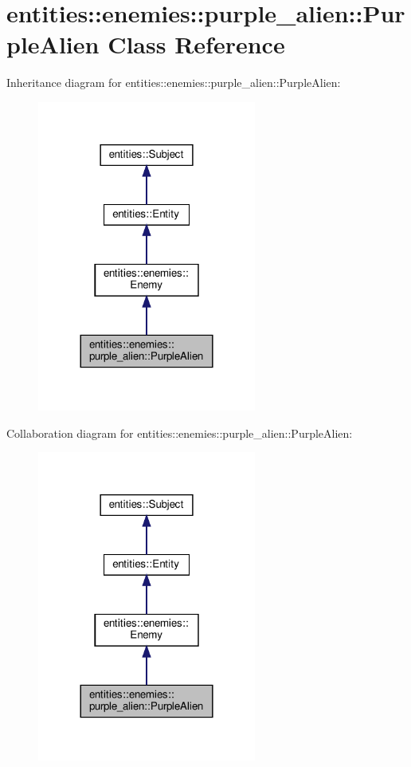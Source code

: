 \hypertarget{classentities_1_1enemies_1_1purple__alien_1_1PurpleAlien}{}\section{entities\+:\+:enemies\+:\+:purple\+\_\+alien\+:\+:Purple\+Alien Class Reference}
\label{classentities_1_1enemies_1_1purple__alien_1_1PurpleAlien}


Inheritance diagram for entities\+:\+:enemies\+:\+:purple\+\_\+alien\+:\+:Purple\+Alien\+:\nopagebreak
\begin{figure}[H]
\begin{center}
\leavevmode
\includegraphics[width=204pt]{classentities_1_1enemies_1_1purple__alien_1_1PurpleAlien__inherit__graph}
\end{center}
\end{figure}


Collaboration diagram for entities\+:\+:enemies\+:\+:purple\+\_\+alien\+:\+:Purple\+Alien\+:\nopagebreak
\begin{figure}[H]
\begin{center}
\leavevmode
\includegraphics[width=204pt]{classentities_1_1enemies_1_1purple__alien_1_1PurpleAlien__coll__graph}
\end{center}
\end{figure}
